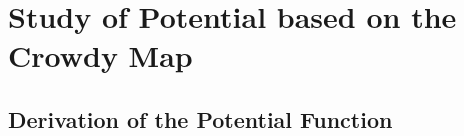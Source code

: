 


\section{Study of Potential based on the Crowdy Map}
\subsection{Derivation of the Potential Function}


